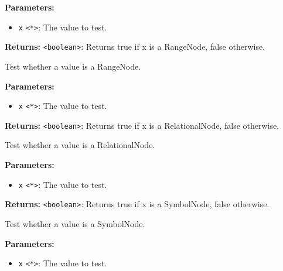 \documentclass[12pt,a4paper]{article}
\begin{document}
\noindent \textbf{Parameters:}
\begin{itemize}
  \item \texttt{x} \texttt{<*>}: The value to test.
\end{itemize}

\noindent \textbf{Returns:} \texttt{<boolean>}: Returns true if \textasciigrave{}x\textasciigrave{} is a RangeNode, false otherwise.

\noindent Test whether a value is a RangeNode.

\vspace{5mm}
\noindent {}


\noindent \textbf{Parameters:}
\begin{itemize}
  \item \texttt{x} \texttt{<*>}: The value to test.
\end{itemize}

\noindent \textbf{Returns:} \texttt{<boolean>}: Returns true if \textasciigrave{}x\textasciigrave{} is a RelationalNode, false otherwise.

\noindent Test whether a value is a RelationalNode.

\vspace{5mm}
\noindent {}


\noindent \textbf{Parameters:}
\begin{itemize}
  \item \texttt{x} \texttt{<*>}: The value to test.
\end{itemize}

\noindent \textbf{Returns:} \texttt{<boolean>}: Returns true if \textasciigrave{}x\textasciigrave{} is a SymbolNode, false otherwise.

\noindent Test whether a value is a SymbolNode.

\vspace{5mm}
\noindent {}


\noindent \textbf{Parameters:}
\begin{itemize}
  \item \texttt{x} \texttt{<*>}: The value to test.
\end{itemize}
\end{document}
